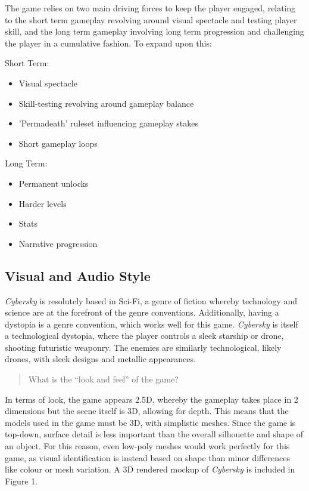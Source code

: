 \documentclass{scrartcl}
\begin{document}
The game relies on two main driving forces to keep the player engaged, relating to the short term gameplay revolving around visual spectacle and testing player skill, and the long term gameplay involving long term progression and challenging the player in a cumulative fashion. To expand upon this:

Short Term:

\begin{itemize}
  \item Visual spectacle
  \item Skill-testing revolving around gameplay balance
  \item 'Permadeath' ruleset influencing gameplay stakes
  \item Short gameplay loops
\end{itemize}

Long Term:

\begin{itemize}
  \item Permanent unlocks
  \item Harder levels
  \item Stats
  \item Narrative progression
\end{itemize}

\subsection{Visual and Audio Style}

\emph{Cybersky} is resolutely based in Sci-Fi, a genre of fiction whereby technology and science are at the forefront of the genre conventions. Additionally, having a dystopia is a genre convention, which works well for this game. \emph{Cybersky} is itself a technological dystopia, where the player controls a sleek starship or drone, shooting futuristic weaponry. The enemies are similarly technological, likely drones, with sleek designs and metallic appearances.

\begin{quote}
  What is the “look and feel” of the game?
\end{quote}

In terms of look, the game appears 2.5D, whereby the gameplay takes place in 2 dimensions but the scene itself is 3D, allowing for depth. This means that the models used in the game must be 3D, with simplistic meshes. Since the game is top-down, surface detail is less important than the overall silhouette and shape of an object. For this reason, even low-poly meshes would work perfectly for this game, as visual identification is instead based on shape than minor differences like colour or mesh variation. A 3D rendered mockup of \emph{Cybersky} is included in Figure 1.
\end{document}
